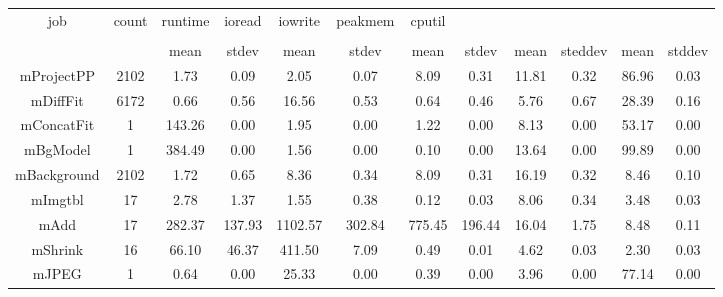 \begin{table}[htb]
    \centering
    \begin{tabular}{@{}cccccccccccc@{}}
        \toprule
        job & count & runtime &  ioread & iowrite & peakmem & cputil\\ \\
        \midrule
         &  & mean & stdev & mean & stdev & mean & stdev & mean & steddev & mean & stddev \\
        mProjectPP & 2102 & 1.73 & 0.09 & 2.05 & 0.07 & 8.09 & 0.31 & 11.81 & 0.32 & 86.96 & 0.03 \\
        mDiffFit & 6172 & 0.66 & 0.56 & 16.56 & 0.53 & 0.64 & 0.46 & 5.76 & 0.67 & 28.39 & 0.16 \\
        mConcatFit & 1 & 143.26 & 0.00 & 1.95 & 0.00 & 1.22 & 0.00 & 8.13 & 0.00 & 53.17 & 0.00 \\
        mBgModel & 1 & 384.49 & 0.00 & 1.56 & 0.00 & 0.10 & 0.00 & 13.64 & 0.00 & 99.89 & 0.00 \\
        mBackground & 2102 & 1.72 & 0.65 & 8.36 & 0.34 & 8.09 & 0.31 & 16.19 & 0.32 & 8.46 & 0.10 \\
        mImgtbl & 17 & 2.78 & 1.37 & 1.55 & 0.38 & 0.12 & 0.03 & 8.06 & 0.34 & 3.48 & 0.03 \\
        mAdd & 17 & 282.37 & 137.93 & 1102.57 & 302.84 & 775.45 & 196.44 & 16.04 & 1.75 & 8.48 & 0.11 \\
        mShrink & 16 & 66.10 & 46.37 & 411.50 & 7.09 & 0.49 & 0.01 & 4.62 & 0.03 & 2.30 & 0.03 \\
        mJPEG & 1 & 0.64 & 0.00 & 25.33 & 0.00 & 0.39 & 0.00 & 3.96 & 0.00 & 77.14 & 0.00 \\
        \bottomrule
    \end{tabular}
\end{table}
